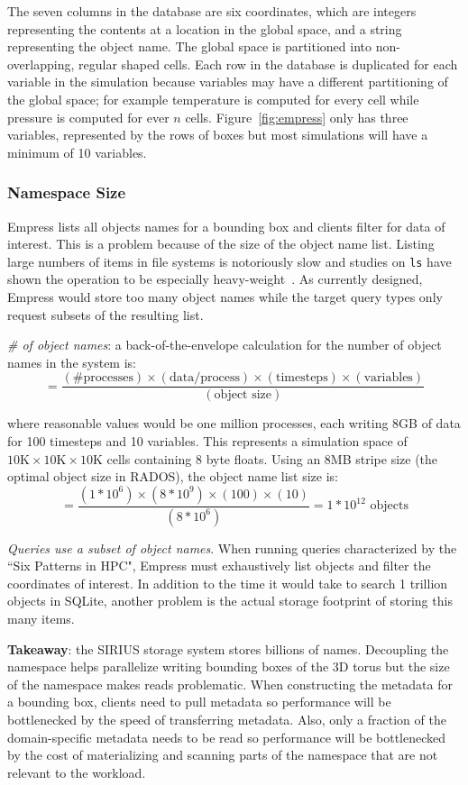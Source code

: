 The seven columns in the database are six coordinates, which are integers
representing the contents at a location in the global space, and a string
representing the object name. The global space is partitioned into
non-overlapping, regular shaped cells.  Each row in the database is duplicated
for each variable in the simulation because variables may have a different
partitioning of the global space; for example temperature is computed for every
cell while pressure is computed for ever \(n\) cells.  Figure~\ref{fig:empress}
only has three variables, represented by the rows of boxes but most simulations
will have a minimum of 10 variables.

\subsubsection{Namespace Size}

Empress lists all objects names for a bounding box and clients filter for data
of interest. This is a problem because of the size of the object name list.
Listing large numbers of items in file systems is notoriously slow and studies
on \texttt{ls} have shown the operation to be especially
heavy-weight~\cite{carns:ipdps09-pvfs, eshel:fast10-panache}.  As currently
designed, Empress would store too many object names while the target query
types only request subsets of the resulting list.

\emph{\# of object names}: a back-of-the-envelope calculation for the number of
object names in the system is:
\[=\frac
  {(\text{\# processes})\times
   (\text{data/process})\times
   (\text{timesteps})\times
   (\text{variables})}
  {(\text{object size})}
\]

where reasonable values would be one million processes, each writing 8GB of
data for 100 timesteps and 10 variables. This represents a simulation space of
\(10\text{K}\times10\text{K}\times10\text{K}\) cells containing 8 byte floats.
Using an 8MB stripe size (the optimal object size in RADOS), the object name
list size is: \[=\frac{(1*10^6)\times(8*10^{9})\times(100)\times(10)}{(8*10^6)}
= 1*10^{12} \text{ objects} \]

\emph{Queries use a subset of object names}. When running queries characterized
by the ``Six Patterns in HPC", Empress must exhaustively list objects and
filter the coordinates of interest.  In addition to the time it would take to
search 1 trillion objects in SQLite, another problem is the actual storage
footprint of storing this many items.

\textbf{Takeaway}: the SIRIUS storage system stores billions of names.
Decoupling the namespace helps parallelize writing bounding boxes of the 3D
torus but the size of the namespace makes reads problematic. When constructing
the metadata for a bounding box, clients need to pull metadata so performance
will be bottlenecked by the speed of transferring metadata. Also, only a
fraction of the domain-specific metadata needs to be read so performance will
be bottlenecked by the cost of materializing and scanning parts of the
namespace that are not relevant to the workload.
